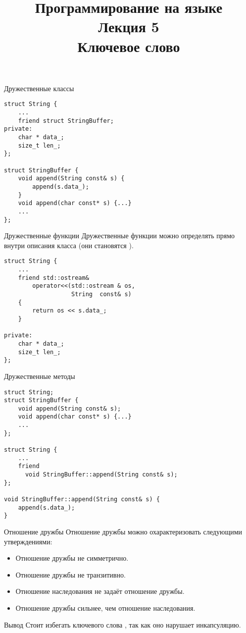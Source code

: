 \documentclass{beamer}
\title{{\bf Программирование на языке \langcpp\protect\\Лекция
5\protect\vspace{1em}\\}Ключевое слово \code{friend}}
\begin{document}
\begin{frame} 
  \titlepage
\end{frame}

\begin{frame}[fragile]{Дружественные классы}
\begin{lstlisting}
struct String {
    ...
    friend struct StringBuffer;
private:
    char * data_;
    size_t len_;
};

struct StringBuffer {
    void append(String const& s) {
        append(s.data_);
    }
    void append(char const* s) {...}
    ...
};                   
\end{lstlisting}
\end{frame}

\begin{frame}[fragile]{Дружественные функции}{}
    Дружественные функции можно определять прямо внутри описания
    класса (они становятся ).
\begin{lstlisting}
struct String {
    ...
    friend std::ostream& 
        operator<<(std::ostream & os, 
                   String  const& s) 
    {
        return os << s.data_;
    }

private:
    char * data_;
    size_t len_;
};                   
\end{lstlisting}
\end{frame}

\begin{frame}[fragile]{Дружественные методы}
\begin{lstlisting}
struct String;
struct StringBuffer {
    void append(String const& s);
    void append(char const* s) {...}
    ...
};                   

struct String {
    ...
    friend 
      void StringBuffer::append(String const& s);
};
        
void StringBuffer::append(String const& s) {
    append(s.data_);
}
\end{lstlisting}
\end{frame}

\begin{frame}[fragile]{Отношение дружбы}
    Отношение дружбы можно охарактеризовать следующими 
    утверждениями: 
    \begin{itemize}
        \item Отношение дружбы не симметрично.
        \item Отношение дружбы не транзитивно.
        \item Отношение наследования не задаёт
            отношение дружбы.
        \item Отношение дружбы сильнее, чем 
            отношение наследования. 
    \end{itemize}
    \begin{block}{Вывод}
        Стоит избегать ключевого слова , так как оно нарушает
        инкапсуляцию.
    \end{block}
\end{frame}
\end{document}
